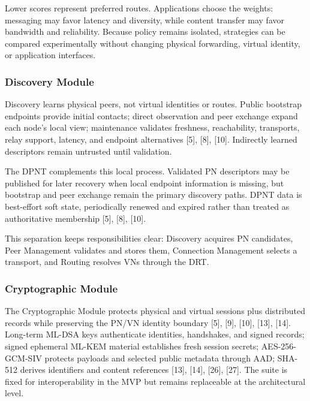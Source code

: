 \documentclass[12pt]{article}
\begin{document}
Lower scores represent preferred routes. Applications choose the weights: messaging may favor latency and diversity, while content transfer may favor bandwidth and reliability. Because policy remains isolated, strategies can be compared experimentally without changing physical forwarding, virtual identity, or application interfaces.






\subsubsection{Discovery Module}


\thesispeerdiscoverytikz


Discovery learns physical peers, not virtual identities or routes. Public bootstrap endpoints provide initial contacts; direct observation and peer exchange expand each node's local view; maintenance validates freshness, reachability, transports, relay support, latency, and endpoint alternatives [5], [8], [10]. Indirectly learned descriptors remain untrusted until validation.

The DPNT complements this local process. Validated PN descriptors may be published for later recovery when local endpoint information is missing, but bootstrap and peer exchange remain the primary discovery paths. DPNT data is best-effort soft state, periodically renewed and expired rather than treated as authoritative membership [5], [8], [10].

This separation keeps responsibilities clear: Discovery acquires PN candidates, Peer Management validates and stores them, Connection Management selects a transport, and Routing resolves VNs through the DRT.




\subsubsection{Cryptographic Module}

The Cryptographic Module protects physical and virtual sessions plus distributed records while preserving the PN/VN identity boundary [5], [9], [10], [13], [14]. Long-term ML-DSA keys authenticate identities, handshakes, and signed records; signed ephemeral ML-KEM material establishes fresh session secrets; AES-256-GCM-SIV protects payloads and selected public metadata through AAD; SHA-512 derives identifiers and content references [13], [14], [26], [27]. The suite is fixed for interoperability in the MVP but remains replaceable at the architectural level.
\end{document}
